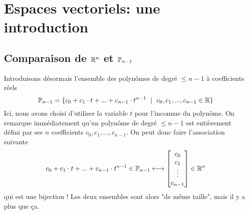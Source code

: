 \chapter{Espaces vectoriels: une introduction}

\section{Comparaison de $\R^n$ et $\P_{n-1}$} \label{sec:comp_rn_polyn}
Introduisons désormais l'ensemble des polynômes de degré $\leq n-1$ à coefficients réels
$$\P_{n-1} = \{c_0 + c_1 \cdot t + ... + c_{n-1} \cdot t^{n-1} \ \mid \ c_0, c_1, ..., c_{n-1} \in \R\}$$
Ici, nous avons choisi d'utiliser la variable $t$ pour l'inconnue du polynôme. On remarque immédiatement qu'un polynôme de degré $\leq n-1$ est entièrement défini par ses $n$ coefficients $c_0,c_1,...,c_{n-1}$. On peut donc faire l'association suivante
\begin{equation}
    c_0 + c_1 \cdot t + ... + c_{n-1} \cdot t^{n-1} \in \P_{n-1} \longleftrightarrow 
\begin{bmatrix}
c_0 \\ c_1 \\ \vdots \\ c_{n-1}
\end{bmatrix} \in \R^n
\label{eq:vecteur_coeff}
\end{equation}
qui est une bijection ! Les deux ensembles sont alors "de même taille", mais il y a plus que ça.

